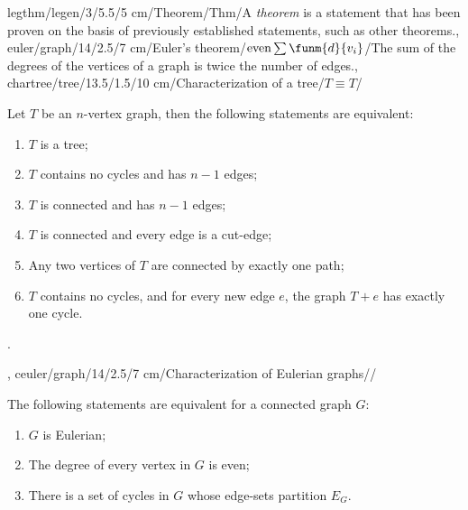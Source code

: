 legthm/legen/3/5.5/5 cm/Theorem/Thm/{A \emph{theorem} is a statement that has been proven on the basis of previously established statements, such as other theorems.},
euler/graph/14/2.5/7 cm/{Euler's theorem}/$\mbox{even}\sum{\funm{d}{v_i}}$/{The sum of the degrees of the vertices of a graph is twice the number of edges.},
chartree/tree/13.5/1.5/10 cm/{Characterization of a tree}/{$T\equiv T$}/{Let $T$ be an $n$-vertex graph, then the following statements are equivalent:\begin{enumerate}\item $T$ is a tree; \item $T$ contains no cycles and has $n-1$ edges; \item $T$ is connected and has $n-1$ edges; \item $T$ is connected and every edge is a cut-edge; \item Any two vertices of $T$ are connected by exactly one path; \item $T$ contains no cycles, and for every new edge $e$, the graph $T+e$ has exactly one cycle.\end{enumerate}.},
ceuler/graph/14/2.5/7 cm/{Characterization of Eulerian graphs}/{}/{The following statements are equivalent for a connected graph $G$:\begin{enumerate}\item $G$ is Eulerian; \item The degree of every vertex in $G$ is even; \item There is a set of cycles in $G$ whose edge-sets partition $E_G$.\end{enumerate}}